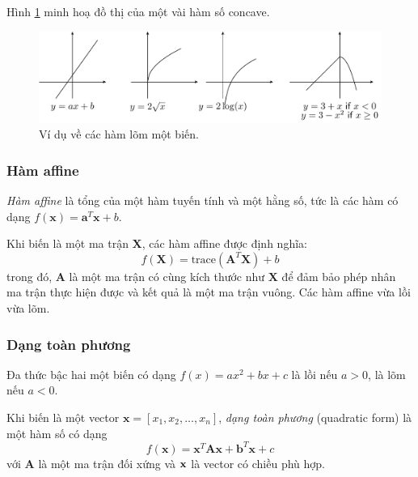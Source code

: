 Hình \ref{fig:16_concavefunctions} minh hoạ đồ thị của một vài hàm số concave.

\begin{figure}[t]
\centering
\includegraphics[width = \textwidth]{Chapters/08_ConvexOptimization/16_convexity/latex/concavefunctions.pdf}
\caption[]{Ví dụ về các hàm lõm một biến.}
\label{fig:16_concavefunctions}
\captionsetup[figure]{format=rule, justification=centering}
\end{figure}

\subsubsection{Hàm affine}
\textit{Hàm affine} là tổng của một hàm tuyến tính và một hằng số, tức là các hàm có dạng $f(\mathbf{x}) = \mathbf{a}^T\mathbf{x} + b $.

Khi biến là một ma trận $\mathbf{X}$, các hàm affine được định nghĩa:
\begin{equation*}
f(\mathbf{X}) = \text{trace}(\mathbf{A}^T\mathbf{X}) + b
\end{equation*}
trong đó, $\mathbf{A}$ là một ma trận có cùng kích thước như $\mathbf{X}$
để đảm bảo phép nhân ma trận thực hiện được và kết quả là một ma trận vuông.
Các hàm affine vừa lồi vừa lõm.

\subsubsection{Dạng toàn phương}
Đa thức bậc hai một biến có dạng $f(x) = a x^2 + bx + c$ là lồi nếu $a > 0$, là lõm nếu $a < 0$.

Khi biến là một vector $\mathbf{x} = [x_1, x_2, \dots, x_n]$, \textit{dạng
toàn phương} ({quadratic form}) là một hàm số có dạng
\begin{equation*}
f(\mathbf{x}) = \mathbf{x}^T\mathbf{A}\mathbf{x} + \mathbf{b}^T\mathbf{x} + c
\end{equation*}
với $\mathbf{A}$ là một ma trận đối xứng và $\mathbf{x}$ là vector có chiều phù hợp.

